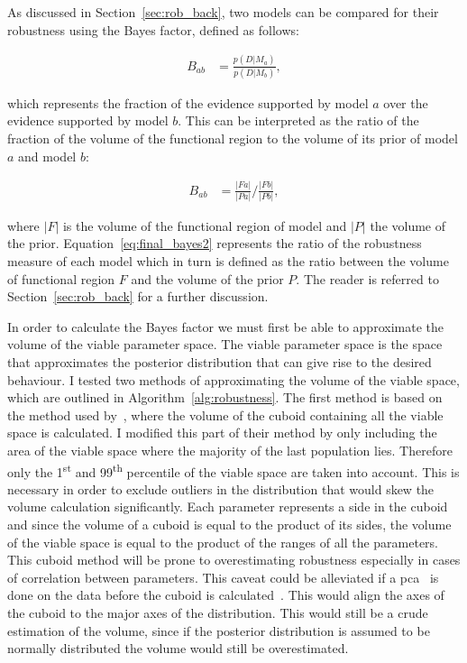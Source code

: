 As discussed in Section~\ref{sec:rob_back}, two models can be compared for their robustness using the Bayes factor, defined as follows:

\begin{align}
 B_{ab} &= \frac{p(D|M_a)}{p(D|M_b)}, \label{eq:final_bayes1}
\end{align}	

\noindent which represents the fraction of the evidence supported by model $a$ over the evidence supported by model $b$. This can be interpreted as the ratio of the fraction of the volume of the functional region to the volume of its prior of model $a$ and model $b$:

\begin{align}
 B_{ab} &= \frac{|Fa|}{|Pa|} / \frac{|Fb|}{|Pb|}, \label{eq:final_bayes2}
\end{align}	

\noindent where $|F|$ is the volume of the functional region of model and $|P|$ the volume of the prior. Equation~\ref{eq:final_bayes2} represents the ratio of the robustness measure of each model which in turn is defined as the ratio between the volume of functional region $F$ and the volume of the prior $P$. The reader is referred to Section~\ref{sec:rob_back} for a further discussion.

In order to calculate the Bayes factor we must first be able to approximate the volume of the viable parameter space. The viable parameter space is the space that approximates the posterior distribution that can give rise to the desired behaviour. I tested two methods of approximating the volume of the viable space, which are outlined in Algorithm~\ref{alg:robustness}. The first method is based on the method used by~\autocite{Hafner:2009ct}, where the volume of the cuboid containing all the viable space is calculated. I modified this part of their method by only including the area of the viable space where the majority of the last population lies. Therefore only the 1\textsuperscript{st} and 99\textsuperscript{th} percentile of the viable space are taken into account. This is necessary in order to exclude outliers in the distribution that would skew the volume calculation significantly. Each parameter represents a side in the cuboid and since the volume of a cuboid is equal to the product of its sides, the volume of the viable space is equal to the product of the ranges of all the parameters. This cuboid method will be prone to overestimating robustness especially in cases of correlation between parameters. This caveat could be alleviated if a \acrfull{pca}~\autocite{Fukunaga:2013wt} is done on the data before the cuboid is calculated~\autocite{Hafner:2009ct}. This would align the axes of the cuboid to the major axes of the distribution. This would still be a crude estimation of the volume, since if the posterior distribution is assumed to be normally distributed the volume would still be overestimated. 

